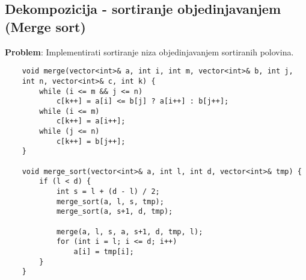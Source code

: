 \documentclass{article}
\begin{document}
\subsection{Dekompozicija - sortiranje objedinjavanjem (Merge sort)}
\textbf{Problem}: Implementirati sortiranje niza objedinjavanjem sortiranih polovina.
\begin{lstlisting}
    void merge(vector<int>& a, int i, int m, vector<int>& b, int j, 
    int n, vector<int>& c, int k) {
        while (i <= m && j <= n)
            c[k++] = a[i] <= b[j] ? a[i++] : b[j++];
        while (i <= m)
            c[k++] = a[i++];
        while (j <= n)
            c[k++] = b[j++];
    }
    
    void merge_sort(vector<int>& a, int l, int d, vector<int>& tmp) {
        if (l < d) {
            int s = l + (d - l) / 2;
            merge_sort(a, l, s, tmp);
            merge_sort(a, s+1, d, tmp);
            
            merge(a, l, s, a, s+1, d, tmp, l);
            for (int i = l; i <= d; i++)
                a[i] = tmp[i];
        }
    }
\end{lstlisting}
\end{document}
